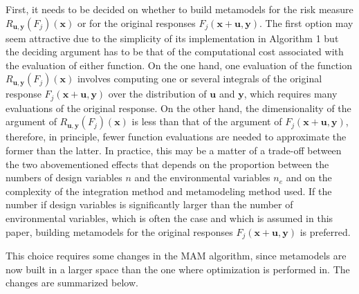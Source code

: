 \documentclass{llncs}
\begin{document}
First, it needs to be decided on whether to build metamodels for the risk measure $R_{\pmb u,\pmb y}(F_j)(\pmb x)$ or for the original responses $F_j (\pmb x+ \pmb u,\pmb y)$. The first option may seem attractive due to the simplicity of its implementation in Algorithm 1 but the deciding argument has to be that of the computational cost associated with the evaluation of either function. On the one hand, one evaluation of the function $R_{\pmb u,\pmb y}(F_j)(\pmb x)$ involves computing one or several integrals of the original response $F_j(\pmb x+ \pmb u,\pmb y)$ over the distribution of $\pmb u$ and $\pmb y$, which requires many evaluations of the original response. On the other hand, the dimensionality of the argument of $R_{\pmb u,\pmb y}(F_j)(\pmb x)$ is less than that of the argument of $F_j(\pmb x+ \pmb u,\pmb y)$, therefore, in principle, fewer function evaluations are needed to approximate the former than the latter. In practice, this may be a matter of a trade-off between the two abovementioned effects that depends on the proportion between the numbers of design variables $n$ and the environmental variables $n_e$ and on the complexity of the integration method and metamodeling method used. If the number if design variables is significantly larger than the number of environmental variables, which is often the case and which is assumed in this paper, building metamodels for the original responses $F_j(\pmb x+ \pmb u,\pmb y)$ is preferred.

This choice requires some changes in the MAM algorithm, since metamodels are now built in a larger space than the one where optimization is performed in. The changes are summarized below.
\end{document}
